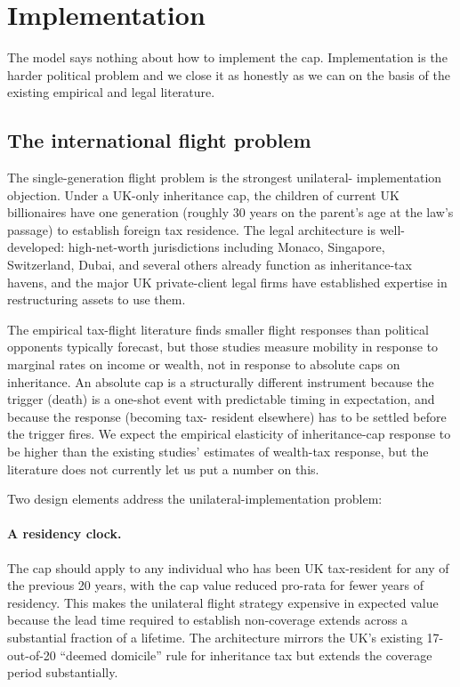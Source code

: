 \documentclass[11pt]{article}
\begin{document}
\section{Implementation}
\label{sec:implementation}

The model says nothing about how to implement the cap.  Implementation
is the harder political problem and we close it as honestly as we can
on the basis of the existing empirical and legal literature.

\subsection{The international flight problem}

The single-generation flight problem is the strongest unilateral-
implementation objection.  Under a UK-only inheritance cap, the
children of current UK billionaires have one generation (roughly
30 years on the parent's age at the law's passage) to establish
foreign tax residence.  The legal architecture is well-developed:
high-net-worth jurisdictions including Monaco, Singapore,
Switzerland, Dubai, and several others already function as
inheritance-tax havens, and the major UK private-client legal firms
have established expertise in restructuring assets to use them.

The empirical tax-flight literature
\citep{young2016millionaire, akcigit2016inventors, moretti2017taxing}
finds smaller flight responses than political opponents typically
forecast, but those studies measure mobility in response to marginal
rates on income or wealth, not in response to absolute caps on
inheritance.  An absolute cap is a structurally different instrument
because the trigger (death) is a one-shot event with predictable
timing in expectation, and because the response (becoming tax-
resident elsewhere) has to be settled before the trigger fires.
We expect the empirical elasticity of inheritance-cap response to
be higher than the existing studies' estimates of wealth-tax
response, but the literature does not currently let us put a number
on this.

Two design elements address the unilateral-implementation problem:

\paragraph{A residency clock.}  The cap should apply to any
individual who has been UK tax-resident for any of the previous 20
years, with the cap value reduced pro-rata for fewer years of
residency.  This makes the unilateral flight strategy expensive in
expected value because the lead time required to establish
non-coverage extends across a substantial fraction of a lifetime.
The architecture mirrors the UK's existing 17-out-of-20 ``deemed
domicile'' rule for inheritance tax but extends the coverage period
substantially.
\end{document}
